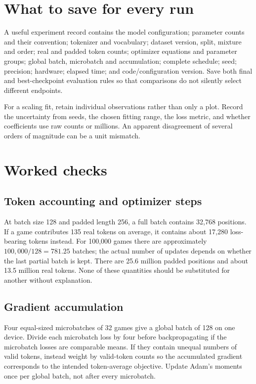 \section{What to save for every run}
A useful experiment record contains the model configuration; parameter counts and their convention; tokenizer and vocabulary; dataset version, split, mixture and order; real and padded token counts; optimizer equations and parameter groups; global batch, microbatch and accumulation; complete schedule; seed; precision; hardware; elapsed time; and code/configuration version. Save both final and best-checkpoint evaluation rules so that comparisons do not silently select different endpoints.

For a scaling fit, retain individual observations rather than only a plot. Record the uncertainty from seeds, the chosen fitting range, the loss metric, and whether coefficients use raw counts or millions. An apparent disagreement of several orders of magnitude can be a unit mismatch.

\section{Worked checks}
\subsection{Token accounting and optimizer steps}
At batch size 128 and padded length 256, a full batch contains 32,768 positions. If a game contributes 135 real tokens on average, it contains about 17,280 loss-bearing tokens instead. For 100,000 games there are approximately $100{,}000/128=781.25$ batches; the actual number of updates depends on whether the last partial batch is kept. There are 25.6 million padded positions and about 13.5 million real tokens. None of these quantities should be substituted for another without explanation.

\subsection{Gradient accumulation}
Four equal-sized microbatches of 32 games give a global batch of 128 on one device. Divide each microbatch loss by four before backpropagating if the microbatch losses are comparable means. If they contain unequal numbers of valid tokens, instead weight by valid-token counts so the accumulated gradient corresponds to the intended token-average objective. Update Adam's moments once per global batch, not after every microbatch.

